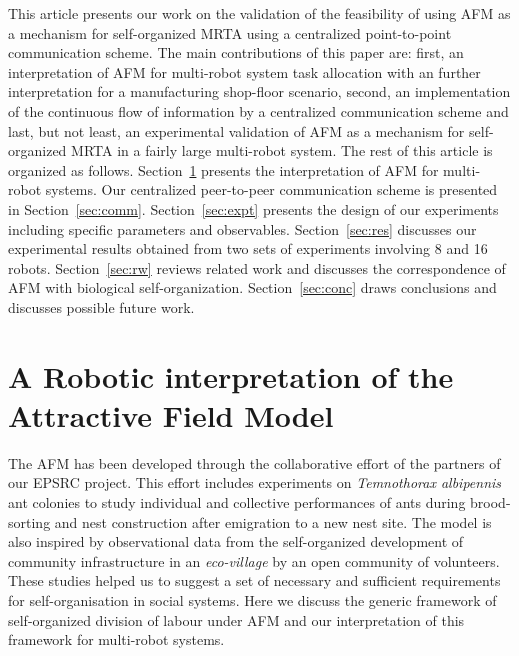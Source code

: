 \documentclass[smallcondensed]{svjour3}
\begin{document}
This article presents our work on the validation of the feasibility of using AFM as a mechanism for self-organized MRTA using a centralized point-to-point communication scheme.  The main contributions of this paper are: first, an interpretation of AFM for multi-robot system task allocation with an further interpretation for a manufacturing shop-floor scenario, second, an implementation of the continuous flow of information by a centralized communication scheme and last, but not least, an experimental validation of AFM as a mechanism for self-organized MRTA in a fairly large multi-robot system.  The rest of this article is organized as follows.  Section~\ref{sec:afm} presents the interpretation of AFM for multi-robot systems.  Our centralized peer-to-peer communication scheme is presented in Section~\ref{sec:comm}. Section~\ref{sec:expt} presents the design of our experiments including specific parameters and observables.  Section~\ref{sec:res} discusses our experimental results obtained from two sets of experiments involving 8 and 16 robots.  Section~\ref{sec:rw} reviews related work and discusses the correspondence of AFM with biological self-organization.  Section~\ref{sec:conc} draws conclusions and discusses possible future work.
\section{A Robotic interpretation of the Attractive Field Model}
\label{sec:afm}
The AFM has been developed through the collaborative effort of the partners of our EPSRC project.  This effort includes experiments on {\em Temnothorax albipennis} ant colonies to study individual and collective performances of ants during brood-sorting and nest construction after emigration to a new nest site.  The model is also inspired by observational data from the self-organized development of community infrastructure in an {\em eco-village} by an open community of volunteers.  These studies helped us to suggest a set of necessary and sufficient requirements for self-organisation in social systems. Here we discuss the generic framework of self-organized division of labour under AFM and our interpretation of this framework for multi-robot systems.
\end{document}
